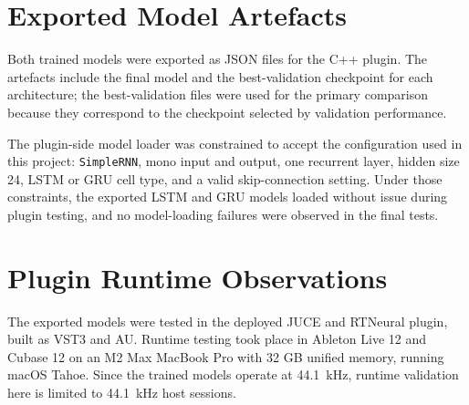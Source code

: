 \section{Exported Model Artefacts}
\label{sec:exported-model-artefacts}

Both trained models were exported as JSON files for the C++ plugin. The artefacts include the final model and the best-validation checkpoint for each architecture; the best-validation files were used for the primary comparison because they correspond to the checkpoint selected by validation performance.

\begin{table}[htbp]
  \centering
  \caption{Exported model artefacts}
  \label{tab:exported-model-artefacts}
\end{table}

The plugin-side model loader was constrained to accept the configuration used in this project: \texttt{SimpleRNN}, mono input and output, one recurrent layer, hidden size 24, LSTM or GRU cell type, and a valid skip-connection setting. Under those constraints, the exported LSTM and GRU models loaded without issue during plugin testing, and no model-loading failures were observed in the final tests.

\section{Plugin Runtime Observations}
\label{sec:plugin-runtime-observations}

The exported models were tested in the deployed JUCE and RTNeural plugin, built as VST3 and AU. Runtime testing took place in Ableton Live 12 and Cubase 12 on an M2 Max MacBook Pro with 32 GB unified memory, running macOS Tahoe. Since the trained models operate at 44.1~kHz, runtime validation here is limited to 44.1~kHz host sessions.

